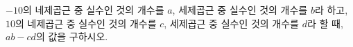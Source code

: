 $-10$의 네제곱근 중 실수인 것의 개수를 $a$, 세제곱근 중 실수인 것의 개수를 $b$라 하고, $10$의 네제곱근 중 실수인 것의 개수를 $c$, 세제곱근 중 실수인 것의 개수를 $d$라 할 때, $ab-cd$의 값을 구하시오.
